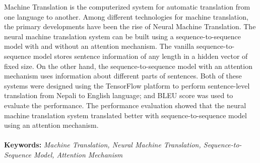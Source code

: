 Machine Translation is the computerized system for automatic translation from one language to another. Among different technologies for machine translation, the primary developments have been the rise of Neural Machine Translation. The neural machine translation system can be built using a sequence-to-sequence model with and without an attention mechanism. The vanilla sequence-to-sequence model stores sentence information of any length in a hidden vector of fixed size. On the other hand, the sequence-to-sequence model with an attention mechanism uses information about different parts of sentences. Both of these systems were designed using the TensorFlow platform to perform sentence-level translation from Nepali to English language; and BLEU score was used to evaluate the performance. The performance evaluation showed that the neural machine translation system translated better with sequence-to-sequence model using an attention mechanism.
\\\\
\textbf{Keywords:} \textit{Machine Translation, Neural Machine Translation, Sequence-to-Sequence Model, Attention Mechanism}
